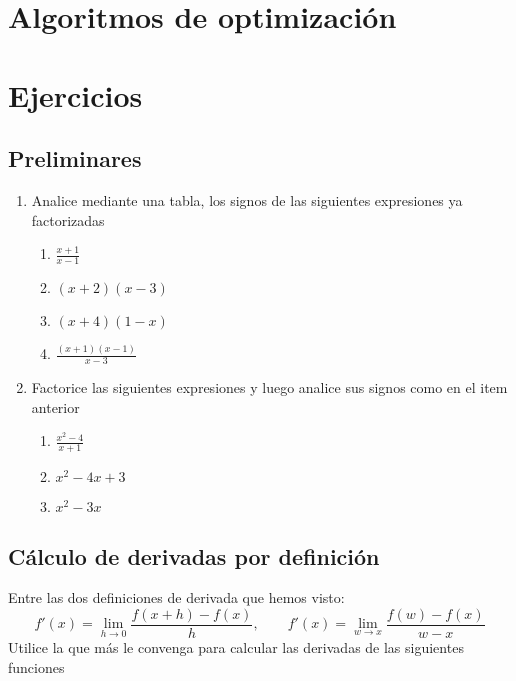 \section{Algoritmos de optimización} \label{svc:sec:opti}

\section{Ejercicios}

\subsection{Preliminares}

\begin{enumerate}

    \item Analice mediante una tabla, los signos de las siguientes expresiones ya factorizadas

    \begin{enumerate}
        \item $\frac{x + 1}{x - 1}$
        \item $(x + 2)(x - 3)$
        \item $(x + 4)(1 - x)$
        \item $\frac{(x + 1)(x - 1)}{x-3}$
    \end{enumerate}

    \item Factorice las siguientes expresiones y luego analice sus signos como en el item anterior
    
    \begin{enumerate}
        \item $\frac{x^2 - 4}{x + 1}$
        \item $x^2 - 4x + 3$
        \item $x^2 - 3x$
    \end{enumerate}

\end{enumerate}

\subsection{Cálculo de derivadas por definición}

Entre las dos definiciones de derivada que hemos visto:
\[f'(x) = \lim_{h \to 0} \frac{f(x + h) - f(x)}{h}, \qquad f'(x) = \lim_{w \to x} \frac{f(w) - f(x)}{w - x}\]
Utilice la que más le convenga para calcular las derivadas de las siguientes funciones

